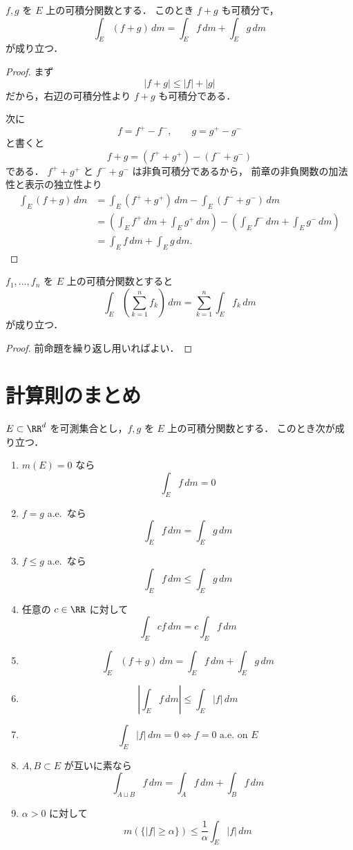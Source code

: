 \begin{proposition}[加法性]
$f,g$ を $E$ 上の可積分関数とする．
このとき $f+g$ も可積分で，
\[
\int_E (f+g)\,dm
=
\int_E f\,dm+\int_E g\,dm
\]
が成り立つ．
\end{proposition}
\begin{proof}
まず
\[
|f+g|\le |f|+|g|
\]
だから，右辺の可積分性より
$f+g$ も可積分である．

次に
\[
f=f^+-f^-,
\qquad
g=g^+-g^-
\]
と書くと
\[
f+g=(f^++g^+)-(f^-+g^-)
\]
である．
$f^++g^+$ と $f^-+g^-$ は非負可積分であるから，
前章の非負関数の加法性と表示の独立性より
\begin{align*}
\int_E (f+g)\,dm
&=
\int_E (f^++g^+)\,dm-\int_E (f^-+g^-)\,dm \\
&=
\left(\int_E f^+\,dm+\int_E g^+\,dm\right)
-\left(\int_E f^-\,dm+\int_E g^-\,dm\right) \\
&=
\int_E f\,dm+\int_E g\,dm.
\end{align*}
\end{proof}

\begin{corollary}[有限和]
$f_1,\dots,f_n$ を $E$ 上の可積分関数とすると
\[
\int_E \left(\sum_{k=1}^n f_k\right)\,dm
=
\sum_{k=1}^n \int_E f_k\,dm
\]
が成り立つ．
\end{corollary}
\begin{proof}
前命題を繰り返し用いればよい．
\end{proof}

\section{計算則のまとめ}

\begin{theorem}[Lebesgue積分の基本公式]
$E \subset \RR^d$ を可測集合とし，$f,g$ を $E$ 上の可積分関数とする．
このとき次が成り立つ．
\begin{enumerate}
    \item $m(E)=0$ なら
    \[
    \int_E f\,dm=0
    \]
    \item $f=g$ a.e.\ なら
    \[
    \int_E f\,dm=\int_E g\,dm
    \]
    \item $f\le g$ a.e.\ なら
    \[
    \int_E f\,dm\le \int_E g\,dm
    \]
    \item 任意の $c \in \RR$ に対して
    \[
    \int_E cf\,dm=c\int_E f\,dm
    \]
    \item
    \[
    \int_E (f+g)\,dm=\int_E f\,dm+\int_E g\,dm
    \]
    \item
    \[
    \left|\int_E f\,dm\right|\le \int_E |f|\,dm
    \]
    \item
    \[
    \int_E |f|\,dm=0
    \iff
    f=0 \text{ a.e.\ on } E
    \]
    \item $A,B \subset E$ が互いに素なら
    \[
    \int_{A \sqcup B} f\,dm
    =
    \int_A f\,dm+\int_B f\,dm
    \]
    \item $\alpha>0$ に対して
    \[
    m(\{|f|\ge \alpha\})
    \le
    \frac{1}{\alpha}\int_E |f|\,dm
    \]
\end{enumerate}
\end{theorem}

